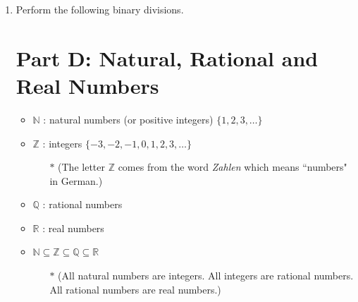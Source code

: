 \documentclass[]{report}
\begin{document}
\begin{enumerate}

\item Perform the following binary divisions.


\section*{Part D: Natural, Rational and Real Numbers}
\begin{framed}
\begin{itemize}
\item $\mathbb{N}$ : natural numbers (or positive integers) $\{1,2,3,\ldots\}$
\item $\mathbb{Z}$ : integers $\{-3,-2,-1,0,1,2,3,\ldots\}$
\begin{itemize}
\item[$\ast$] (The letter $\mathbb{Z}$ comes from the word \emph{Zahlen} which means ``numbers" in German.)
\end{itemize}
\item $\mathbb{Q}$ : rational numbers
\item $\mathbb{R}$ : real numbers
\item $\mathbb{N} \subseteq \mathbb{Z } \subseteq \mathbb{Q} \subseteq \mathbb{R}$
\begin{itemize}
\item[$\ast$] (All natural numbers are integers. All integers are rational numbers. All rational numbers are real numbers.)
\end{itemize}
\end{itemize}
\end{framed}


\end{enumerate}
\end{document}
